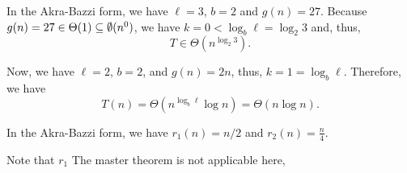 
In the Akra-Bazzi form, we have $\ell=3$, $b=2$ and $g(n)=27$.
Because $g(n) = 27 \in \Theta(1) \subseteq \emptyset(n^{0})$, we have $k=0 < \log_b \ell = \log_2 3$ and, thus, \[
    T \in \Theta \left( n^{\log_2 3} \right)
.\] 


Now, we have $\ell=2$, $b=2$, and $g(n) = 2n$, thus, $k=1=\log_b \ell$.
Therefore, we have \[
    T(n) = \Theta(n^{\log_b \ell} \log n) = \Theta(n \log n)
.\] 


In the Akra-Bazzi form, we have $r_1(n)=n / 2$ and $r_2(n) = \frac{n}{4}$. 

Note that $r_1$
The master theorem is not applicable here, 

